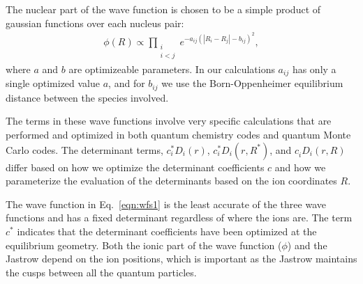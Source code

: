 \documentclass[aip,jcp,numerical,reprint]{revtex4-1}
\begin{document}
The nuclear part of the wave function is chosen to be a simple product of gaussian functions over each nucleus pair: 
\begin{align}
\phi(R) \propto \prod_{\substack{i \\ i<j}} e^{-a_{ij}\left(|R_{i}-R_{j}|-b_{ij}\right)^2}, 
\end{align}
where $a$ and $b$ are optimizeable parameters. In our calculations $a_{ij}$ has only a single optimized value $a$, and for $b_{ij}$ we use the Born-Oppenheimer equilibrium distance between the species involved.

The terms in these wave functions involve very specific calculations that are performed and optimized in both quantum chemistry codes and quantum Monte Carlo codes.  
The determinant terms, $c_{i}^{*}D_{i}(r) $, $c_{i}^{*}D_{i}(r,R^{*}) $, and $c_{i}^{}D_{i}(r,R)$ differ based on how we optimize the determinant coefficients $c$ and how we parameterize the evaluation of the determinants based on the ion coordinates $R$.   

The  wave function in Eq.~\eqref{eqn:wfs1} is the least accurate of the three wave functions and has a fixed determinant regardless of where the ions are.  The term $c^{*}$ indicates that the determinant coefficients have been optimized at the equilibrium geometry.  
Both the ionic part of the wave function ($\phi$) and the Jastrow depend on the ion positions, which is important as the Jastrow maintains the cusps between all the quantum particles.  
\end{document}

